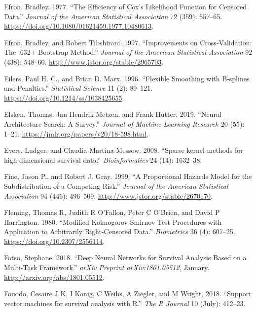 \documentclass[
  letterpaper,
  krantz2]{style/krantz}
\newlength{\cslhangindent}
\newenvironment{CSLReferences}[2] %
 {\begin{list}{}{%
  \setlength{\itemindent}{0pt}
  \setlength{\leftmargin}{0pt}
  \setlength{\parsep}{0pt}
  \ifodd #1
   \setlength{\leftmargin}{\cslhangindent}
   \setlength{\itemindent}{-1\cslhangindent}
  \fi
  \setlength{\itemsep}{#2\baselineskip}}}
 {\end{list}}
\begin{document}
\begin{CSLReferences}{1}{0}
Efron, Bradley. 1977. {``{The Efficiency of Cox's Likelihood Function
for Censored Data}.''} \emph{Journal of the American Statistical
Association} 72 (359): 557--65.
\url{https://doi.org/10.1080/01621459.1977.10480613}.

Efron, Bradley, and Robert Tibshirani. 1997. {``Improvements on
Cross-Validation: The .632+ Bootstrap Method.''} \emph{Journal of the
American Statistical Association} 92 (438): 548--60.
\url{http://www.jstor.org/stable/2965703}.

Eilers, Paul H. C., and Brian D. Marx. 1996. {``{Flexible Smoothing with
B-splines and Penalties}.''} \emph{Statistical Science} 11 (2): 89--121.
\url{https://doi.org/10.1214/ss/1038425655}.

Elsken, Thomas, Jan Hendrik Metzen, and Frank Hutter. 2019. {``Neural
Architecture Search: A Survey.''} \emph{Journal of Machine Learning
Research} 20 (55): 1--21. \url{https://jmlr.org/papers/v20/18-598.html}.

Evers, Ludger, and Claudia-Martina Messow. 2008. {``{Sparse kernel
methods for high-dimensional survival data}.''} \emph{Bioinformatics} 24
(14): 1632--38.

Fine, Jason P., and Robert J. Gray. 1999. {``A Proportional Hazards
Model for the Subdistribution of a Competing Risk.''} \emph{Journal of
the American Statistical Association} 94 (446): 496--509.
\url{http://www.jstor.org/stable/2670170}.

Fleming, Thomas R, Judith R O'Fallon, Peter C O'Brien, and David P
Harrington. 1980. {``{Modified Kolmogorov-Smirnov Test Procedures with
Application to Arbitrarily Right-Censored Data}.''} \emph{Biometrics} 36
(4): 607--25. \url{https://doi.org/10.2307/2556114}.

Fotso, Stephane. 2018. {``{Deep Neural Networks for Survival Analysis
Based on a Multi-Task Framework}.''} \emph{arXiv Preprint
arXiv:1801.05512}, January. \url{http://arxiv.org/abs/1801.05512}.

Fouodo, Cesaire J K, I Konig, C Weihs, A Ziegler, and M Wright. 2018.
{``{Support vector machines for survival analysis with R}.''} \emph{The
R Journal} 10 (July): 412--23.


\end{CSLReferences}
\end{document}
